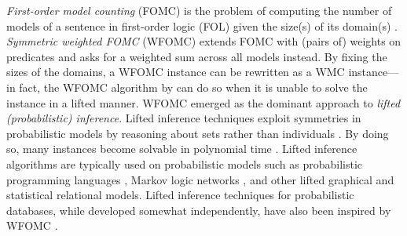 \emph{First-order model counting} (FOMC) is the problem of computing the number
of models of a sentence in first-order logic (FOL) given the size(s) of its
domain(s) \citep{DBLP:conf/pods/BeameBGS15}. \emph{Symmetric weighted FOMC}
(WFOMC) extends FOMC with (pairs of) weights on predicates and asks for a
weighted sum across all models instead. By fixing the sizes of the domains, a
WFOMC instance can be rewritten as a WMC instance---in fact, the WFOMC algorithm
by \citet{DBLP:conf/ijcai/BroeckTMDR11} can do so when it is unable to solve the
instance in a lifted manner. WFOMC emerged as the dominant approach to
\emph{lifted (probabilistic) inference}. Lifted inference techniques exploit
symmetries in probabilistic models by reasoning about sets rather than
individuals \citep{DBLP:conf/ecai/Kersting12}. By doing so, many instances
become solvable in polynomial time \citep{DBLP:conf/nips/Broeck11}. Lifted
inference algorithms are typically used on probabilistic models such as
probabilistic programming languages
\citep{DBLP:journals/ml/RaedtK15,DBLP:journals/ijar/RiguzziBZCL17}, Markov logic
networks
\citep{DBLP:conf/ijcai/BroeckTMDR11,DBLP:journals/cacm/GogateD16,DBLP:journals/ml/RichardsonD06},
and other lifted graphical \citep{DBLP:journals/ml/KimmigMG15} and statistical
relational \citep{DBLP:series/synthesis/2016Raedt} models. Lifted inference
techniques for probabilistic databases, while developed somewhat independently,
have also been inspired by WFOMC
\citep{DBLP:journals/pvldb/GatterbauerS15,DBLP:journals/debu/GribkoffSB14}.



